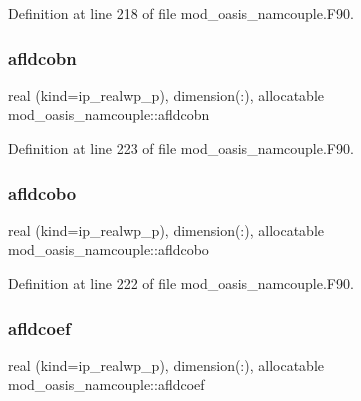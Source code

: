 Definition at line 218 of file mod\+\_\+oasis\+\_\+namcouple.\+F90.

\mbox{\label{namespacemod__oasis__namcouple_a207709166cd4d719d65d76e6c043fd6c}} 
\subsubsection{\texorpdfstring{afldcobn}{afldcobn}}
{\footnotesize\ttfamily real (kind=ip\+\_\+realwp\+\_\+p), dimension(\+:), allocatable mod\+\_\+oasis\+\_\+namcouple\+::afldcobn\hspace{0.3cm}{\ttfamily [private]}}



Definition at line 223 of file mod\+\_\+oasis\+\_\+namcouple.\+F90.

\mbox{\label{namespacemod__oasis__namcouple_aa9d178659282698ffb6c186ff48bed3c}} 
\subsubsection{\texorpdfstring{afldcobo}{afldcobo}}
{\footnotesize\ttfamily real (kind=ip\+\_\+realwp\+\_\+p), dimension(\+:), allocatable mod\+\_\+oasis\+\_\+namcouple\+::afldcobo\hspace{0.3cm}{\ttfamily [private]}}



Definition at line 222 of file mod\+\_\+oasis\+\_\+namcouple.\+F90.

\mbox{\label{namespacemod__oasis__namcouple_a19fb86d643bb8761d5a8e32d645d5963}} 
\subsubsection{\texorpdfstring{afldcoef}{afldcoef}}
{\footnotesize\ttfamily real (kind=ip\+\_\+realwp\+\_\+p), dimension(\+:), allocatable mod\+\_\+oasis\+\_\+namcouple\+::afldcoef\hspace{0.3cm}{\ttfamily [private]}}



